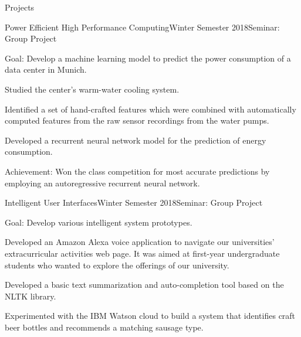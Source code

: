 \documentclass{resume} %
\begin{document}
\begin{rSection}{Projects}
\begin{rSubsection}{Power Efficient High Performance Computing}{Winter Semester 2018}{Seminar: Group Project}{}
\item Goal: Develop a machine learning model to predict the power consumption of a data center in Munich.
\item Studied the center's warm-water cooling system.
\item Identified a set of hand-crafted features which were combined with automatically computed features from the raw sensor recordings from the water pumps.
\item Developed a recurrent neural network model for the prediction of energy consumption.
\item Achievement: Won the class competition for most accurate predictions by employing an autoregressive recurrent neural network.
\end{rSubsection}

\begin{rSubsection}{Intelligent User Interfaces}{Winter Semester 2018}{Seminar: Group Project}{}
\item Goal: Develop various intelligent system prototypes.
\item Developed an Amazon Alexa voice application to navigate our universities' extracurricular activities web page. It was aimed at first-year undergraduate students who wanted to explore the offerings of our university. 
\item Developed a basic text summarization and auto-completion tool based on the NLTK library.
\item Experimented with the IBM Watson cloud to build a system that identifies craft beer bottles and recommends a matching sausage type.
\end{rSubsection}

\end{rSection}


\end{document}
